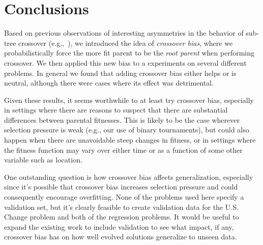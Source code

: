 \documentclass{sig-alternate}
\begin{document}
\section{Conclusions} \label{sec:Conclusions}

Based on previous observations of interesting asymmetries in the behavior of sub-tree crossover 
(e.g.,~\cite{McPheeDonatucciDramdahl:2014}), we introduced the idea of \emph{crossover bias}, where
we probabilistically force the more fit parent to be the \emph{root parent} when performing crossover.
We then applied this new bias to a experiments on several different problems. In general we found
that adding crossover bias either helps or is neutral, although there were cases where its effect
was detrimental.

Given these results, it seems worthwhile to at least try crossover bias, especially in settings
where there are reasons to suspect that there are substantial differences between parental
fitnesses. This is likely to be the case wherever selection pressure is weak (e.g., our use
of binary tournaments), but could also happen when there are
unavoidable steep changes in fitness, or in settings where the fitness function may vary
over either time or as a function of some other variable such as location.

One outstanding question is how crossover bias affects generalization, especially since it's possible
that crossover bias increases selection pressure and could consequently encourage overfitting. 
None of the problems used here specify a validation set, but it's clearly feasible to create 
validation data for the U.S. Change problem and both of the regression problems. It would be
useful to expand the existing work to include validation to see what impact, if any, crossover 
bias has on how well evolved solutions generalize to unseen data.
\end{document}
